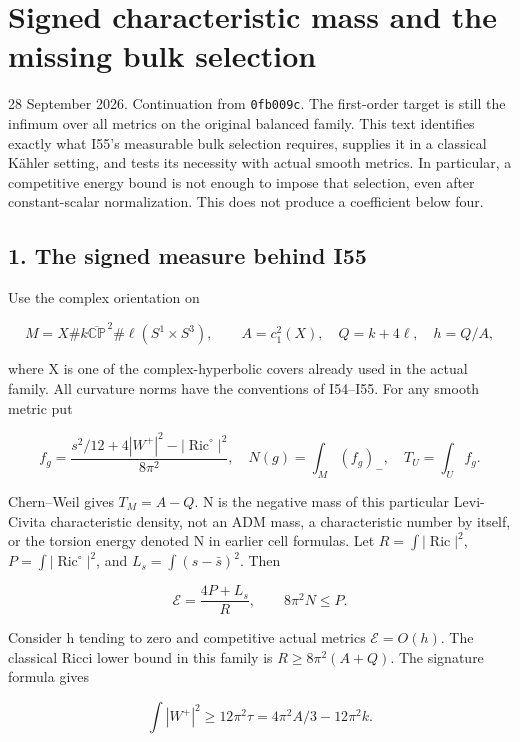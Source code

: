 \documentclass[
  10pt,
]{article}
\author{}
\date{}
\begin{document}
\hypertarget{signed-characteristic-mass-and-the-missing-bulk-selection}{%
\section{Signed characteristic mass and the missing bulk
selection}\label{signed-characteristic-mass-and-the-missing-bulk-selection}}

28 September 2026. Continuation from \texttt{0fb009c}. The first-order
target is still the infimum over all metrics on the original balanced
family. This text identifies exactly what I55's measurable bulk
selection requires, supplies it in a classical Kähler setting, and tests
its necessity with actual smooth metrics. In particular, a competitive
energy bound is not enough to impose that selection, even after
constant-scalar normalization. This does not produce a coefficient below
four.

\hypertarget{the-signed-measure-behind-i55}{%
\subsection{1. The signed measure behind
I55}\label{the-signed-measure-behind-i55}}

Use the complex orientation on

\[
 M=X\#k\overline{\mathbb{CP}}^{\,2}\#\ell(S^1\times S^3),
 \qquad A=c_1^2(X),\quad Q=k+4\ell,\quad h=Q/A,
\]

where X is one of the complex-hyperbolic covers already used in the
actual family. All curvature norms have the conventions of I54--I55. For
any smooth metric put

\[
 f_g=\frac{s^2/12+4|W^+|^2-|\operatorname{Ric}^{\circ}|^2}{8\pi^2},
 \quad N(g)=\int_M(f_g)_-,\quad T_U=\int_U f_g.
 \tag{1.1}
\]

Chern--Weil gives \(T_M=A-Q\). N is the negative mass of this particular
Levi-Civita characteristic density, not an ADM mass, a characteristic
number by itself, or the torsion energy denoted N in earlier cell
formulas. Let \(R=\int|\operatorname{Ric}|^2\),
\(P=\int|\operatorname{Ric}^{\circ}|^2\), and \(L_s=\int(s-\bar s)^2\).
Then

\[
 \mathcal E=\frac{4P+L_s}{R},\qquad 8\pi^2N\le P.
 \tag{1.2}
\]

Consider h tending to zero and competitive actual metrics
\(\mathcal E=O(h)\). The classical Ricci lower bound in this family is
\(R\ge8\pi^2(A+Q)\). The signature formula gives

\[
 \int|W^+|^2\ge12\pi^2\tau
   =4\pi^2A/3-12\pi^2k.
\]
\end{document}
